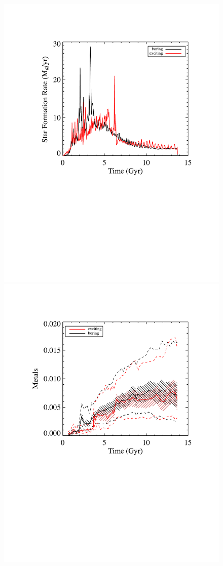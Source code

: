 \documentclass[nofootinbib,twocolumn,prd]{emulateapj}
\begin{document}
\begin{figure}
\includegraphics[width=\columnwidth]{Figures/sfh}
\includegraphics[width=\columnwidth]{Figures/zvst}

\end{figure}
\end{document}
